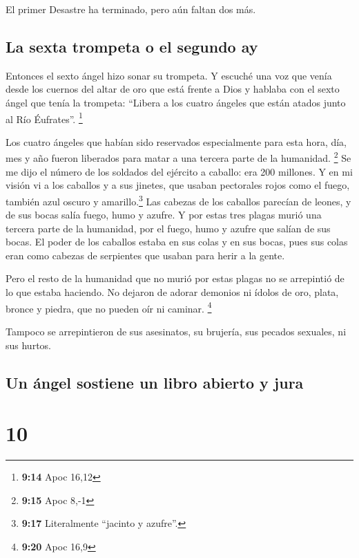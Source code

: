  El primer Desastre ha terminado, pero aún faltan dos
más.

\hypertarget{la-sexta-trompeta-o-el-segundo-ay}{%
\subsection{La sexta trompeta o el segundo
ay}\label{la-sexta-trompeta-o-el-segundo-ay}}

 Entonces el sexto ángel hizo sonar su trompeta. Y
escuché una voz que venía desde los cuernos del altar de oro que está
frente a Dios  y hablaba con el sexto ángel que tenía la
trompeta: ``Libera a los cuatro ángeles que están atados junto al Río
Éufrates''. \footnote{\textbf{9:14} Apoc 16,12}

 Los cuatro ángeles que habían sido reservados
especialmente para esta hora, día, mes y año fueron liberados para matar
a una tercera parte de la humanidad. \footnote{\textbf{9:15} Apoc 8,-1}
 Se me dijo el número de los soldados del ejército a
caballo: era 200 millones.  Y en mi visión vi a los
caballos y a sus jinetes, que usaban pectorales rojos como el fuego,
también azul oscuro y amarillo.\footnote{\textbf{9:17} Literalmente
  ``jacinto y azufre''.} Las cabezas de los caballos parecían de leones,
y de sus bocas salía fuego, humo y azufre.  Y por estas
tres plagas murió una tercera parte de la humanidad, por el fuego, humo
y azufre que salían de sus bocas.  El poder de los
caballos estaba en sus colas y en sus bocas, pues sus colas eran como
cabezas de serpientes que usaban para herir a la gente.

 Pero el resto de la humanidad que no murió por estas
plagas no se arrepintió de lo que estaba haciendo. No dejaron de adorar
demonios ni ídolos de oro, plata, bronce y piedra, que no pueden oír ni
caminar. \footnote{\textbf{9:20} Apoc 16,9}

 Tampoco se arrepintieron de sus asesinatos, su brujería,
sus pecados sexuales, ni sus hurtos.

\hypertarget{un-uxe1ngel-sostiene-un-libro-abierto-y-jura}{%
\subsection{Un ángel sostiene un libro abierto y
jura}\label{un-uxe1ngel-sostiene-un-libro-abierto-y-jura}}

\hypertarget{section-9}{%
\section{10}\label{section-9}}


